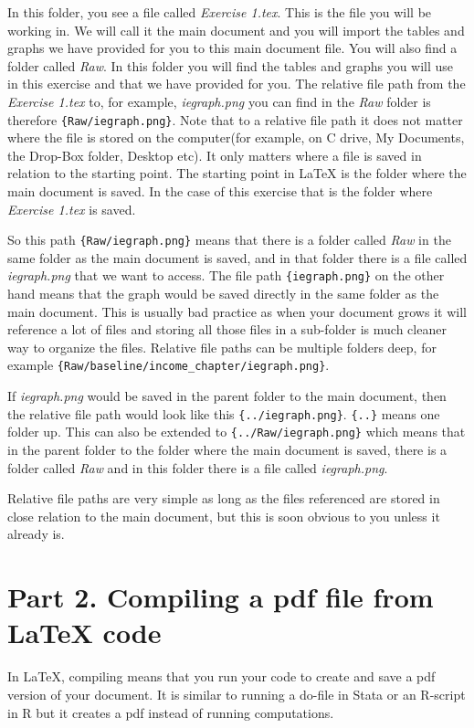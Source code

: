 \documentclass[12pts]{report}
\begin{document}
In this folder, you see a file called \emph{Exercise 1.tex}. This is the file you will be working in. We will call it the main document and you will import the tables and graphs we have provided for you to this main document file. You will also find a folder called \emph{Raw}. In this folder you will find the tables and graphs you will use in this exercise and that we have provided for you. The relative file path from the \emph{Exercise 1.tex} to, for example, \emph{iegraph.png} you can find in the \emph{Raw} folder is therefore \verb|{Raw/iegraph.png}|. Note that to a relative file path it does not matter where the file is stored on the computer(for example, on C drive, My Documents, the Drop-Box folder, Desktop etc). It only matters where a file is saved in relation to the starting point. The starting point in {\LaTeX} is the folder where the main document is saved. In the case of this exercise that is the folder where \emph{Exercise 1.tex} is saved.

So this path \verb|{Raw/iegraph.png}| means that there is a folder called \emph{Raw} in the same folder as the main document is saved, and in that folder there is a file called \emph{iegraph.png} that we want to access. The file path \verb|{iegraph.png}| on the other hand means that the graph would be saved directly in the same folder as the main document. This is usually bad practice as when your document grows it will reference a lot of files and storing all those files in a sub-folder is much cleaner way to organize the files. Relative file paths can be multiple folders deep, for example \verb|{Raw/baseline/income_chapter/iegraph.png}|. 

If \emph{iegraph.png} would be saved in the parent folder to the main document, then the relative file path would look like this \verb|{../iegraph.png}|. \verb|{..}| means one folder up. This can also be extended to \verb|{../Raw/iegraph.png}| which means that in the parent folder to the folder where the main document is saved, there is a folder called \emph{Raw} and in this folder there is a file called \emph{iegraph.png}.

Relative file paths are very simple as long as the files referenced are stored in close relation to the main document, but this is soon obvious to you unless it already is.

\section*{Part 2. Compiling a pdf file from  {\LaTeX} code}
In {\LaTeX}, compiling means that you run your code to create and save a pdf version of your document. It is similar to running a do-file in Stata or an R-script in R but it creates a pdf instead of running computations. 
\end{document}
